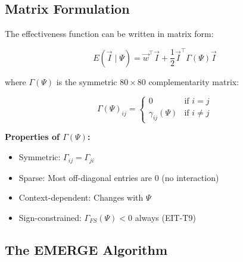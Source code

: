 \subsection{Matrix Formulation}
\label{subsec:emp2-matrix}

\begin{tcolorbox}[colback=gray!5!white, colframe=gray!75!black,
    title=\textbf{EIT-EMP-2-D3: Quadratic Form}]

The effectiveness function can be written in matrix form:

\begin{equation}
E(\vec{I} \;|\; \Psi) = \vec{w}^\top \vec{I} + \frac{1}{2} \vec{I}^\top \Gamma(\Psi) \vec{I}
\label{eq:quadratic}
\end{equation}

where $\Gamma(\Psi)$ is the symmetric $80 \times 80$ complementarity matrix:

\begin{equation}
\Gamma(\Psi)_{ij} = \begin{cases}
0 & \text{if } i = j \\
\gamma_{ij}(\Psi) & \text{if } i \neq j
\end{cases}
\end{equation}

\textbf{Properties of $\Gamma(\Psi)$:}
\begin{itemize}[nosep]
    \item Symmetric: $\Gamma_{ij} = \Gamma_{ji}$
    \item Sparse: Most off-diagonal entries are 0 (no interaction)
    \item Context-dependent: Changes with $\Psi$
    \item Sign-constrained: $\Gamma_{FS}(\Psi) < 0$ always (EIT-T9)
\end{itemize}

\end{tcolorbox}

\subsection{The EMERGE Algorithm}
\label{subsec:emp2-emerge}

